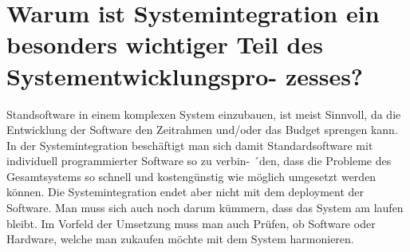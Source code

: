 \documentclass[12pt]{article}
\begin{document}
\section{Warum ist Systemintegration ein besonders wichtiger Teil des Systementwicklungspro- zesses?}
Standsoftware in einem komplexen System einzubauen, ist meist Sinnvoll, da die Entwicklung der Software den Zeitrahmen und/oder das Budget sprengen kann. In der Systemintegration beschäftigt man sich damit Standardsoftware mit individuell programmierter Software so zu verbin- ´den, dass die Probleme des Gesamtsystems so schnell und kostengünstig wie möglich umgesetzt werden können. Die Systemintegration endet aber nicht mit dem deployment der Software. Man muss sich auch noch darum kümmern, dass das System am laufen bleibt. Im Vorfeld der Umsetzung muss man auch Prüfen, ob Software oder Hardware, welche man zukaufen möchte mit dem System harmonieren.
\end{document}
